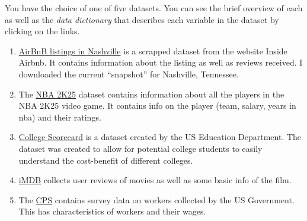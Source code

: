 \documentclass[12pt]{article}
\begin{document}
You have the choice of one of five datasets. You can see the brief
overview of each as well as the \emph{data dictionary} that describes
each variable in the dataset by clicking on the links.

\begin{enumerate}
\def\labelenumi{\arabic{enumi}.}
\item
  \href{https://github.com/kylebutts/UARK_4753/tree/main/Homework/HW2/data/airbnb_nashville}{AirBnB
  listings in Nashville} is a scrapped dataset from the website Inside
  Airbnb. It contains information about the listing as well as reviews
  received. I downloaded the current ``snapshot'' for Nashville,
  Tennessee.
\item
  The
  \href{https://github.com/kylebutts/UARK_4753/tree/main/Homework/HW2/data/nba_2k25_player_ratings}{NBA
  2K25} dataset contains information about all the players in the NBA
  2K25 video game. It contains info on the player (team, salary, years
  in nba) and their ratings.
\item
  \href{https://github.com/kylebutts/UARK_4753/tree/main/Homework/HW2/data/college_scorecard}{College
  Scorecard} is a dataset created by the US Education Department. The
  dataset was created to allow for potential college students to easily
  understand the cost-benefit of different colleges.
\item
  \href{https://github.com/kylebutts/UARK_4753/tree/main/Homework/HW2/data/imdb}{iMDB}
  collects user reviews of movies as well as some basic info of the
  film.
\item
  The
  \href{https://github.com/kylebutts/UARK_4753/tree/main/Homework/HW2/data/community_population_survey}{CPS}
  contains survey data on workers collected by the US Government. This
  has characteristics of workers and their wages.
\end{enumerate}
\end{document}
